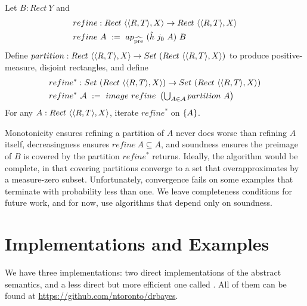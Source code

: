 \documentclass{llncs}
\newcommand{\prehat}{_\mathrm{\widehat{pre}}}
\begin{document}
\begin{definition}
\label{def:preimage-refinement}
Let $B : Rect~Y$ and
\begin{equation}
\begin{aligned}
	&refine : Rect~\pair{\pair{R,T},X} \to Rect~\pair{\pair{R,T},X} \\
	&refine~A \ := \ ap\prehat~(\hat{h}~j_0~A)~B
\end{aligned}
\end{equation}
Define $partition : Rect~\langle{\langle{R,T}\rangle,X}\rangle \to Set~(Rect~\langle{\langle{R,T}\rangle,X}\rangle)$ to produce positive-measure, disjoint rectangles, and define
\begin{equation}
\begin{aligned}
	&refine^* : Set~(Rect~\langle{\langle{R,T}\rangle,X}\rangle) \to Set~(Rect~\langle{\langle{R,T}\rangle,X}\rangle) \\
	&refine^*~\mathcal{A} \ := \ image~refine~\left(\textstyle\bigcup_{A \in \mathcal{A}} partition~A \right)
\end{aligned}
\end{equation}
For any $A : Rect~\langle{\langle{R,T}\rangle,X}\rangle$, iterate $refine^*$ on $\{{A}\}$.
\end{definition}

Monotonicity ensures refining a partition of $A$ never does worse than refining $A$ itself, decreasingness ensures $refine~A \subseteq A$, and soundness ensures the preimage of $B$ is covered by the partition $refine^*$ returns.
Ideally, the algorithm would be complete, in that covering partitions converge to a set that overapproximates by a measure-zero subset.
Unfortunately, convergence fails on some examples that terminate with probability less than one.
We leave completeness conditions for future work, and for now, use algorithms that depend only on soundness.


\section{Implementations and Examples}
\label{sec:implementation}

We have three implementations: two direct implementations of the abstract semantics, and a less direct but more efficient one called .
All of them can be found at \url{https://github.com/ntoronto/drbayes}.
\end{document}
